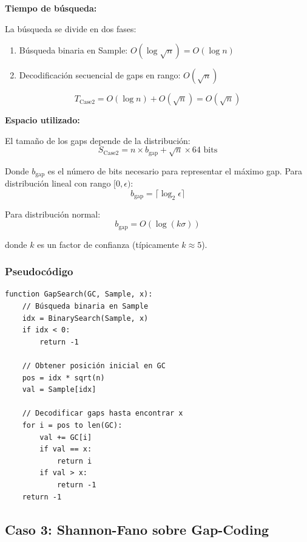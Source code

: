 \documentclass[11pt, twocolumn]{article}
\begin{document}
\textbf{Tiempo de búsqueda:}

La búsqueda se divide en dos fases:
\begin{enumerate}
    \item Búsqueda binaria en Sample: $O(\log \sqrt{n}) = O(\log n)$
    \item Decodificación secuencial de gaps en rango: $O(\sqrt{n})$
\end{enumerate}

\begin{equation}
T_{\text{Case2}} = O(\log n) + O(\sqrt{n}) = O(\sqrt{n})
\end{equation}

\textbf{Espacio utilizado:}

El tamaño de los gaps depende de la distribución:
\begin{equation}
S_{\text{Case2}} = n \times b_{\text{gap}} + \sqrt{n} \times 64 \text{ bits}
\end{equation}

Donde $b_{\text{gap}}$ es el número de bits necesario para representar el máximo gap. Para distribución lineal con rango $[0, \epsilon)$:
\begin{equation}
b_{\text{gap}} = \lceil \log_2 \epsilon \rceil
\end{equation}

Para distribución normal:
\begin{equation}
b_{\text{gap}} = O(\log(k\sigma))
\end{equation}

donde $k$ es un factor de confianza (típicamente $k \approx 5$).

\subsubsection{Pseudocódigo}

\begin{lstlisting}
function GapSearch(GC, Sample, x):
    // Búsqueda binaria en Sample
    idx = BinarySearch(Sample, x)
    if idx < 0:
        return -1

    // Obtener posición inicial en GC
    pos = idx * sqrt(n)
    val = Sample[idx]

    // Decodificar gaps hasta encontrar x
    for i = pos to len(GC):
        val += GC[i]
        if val == x:
            return i
        if val > x:
            return -1
    return -1
\end{lstlisting}

\subsection{Caso 3: Shannon-Fano sobre Gap-Coding}
\end{document}
